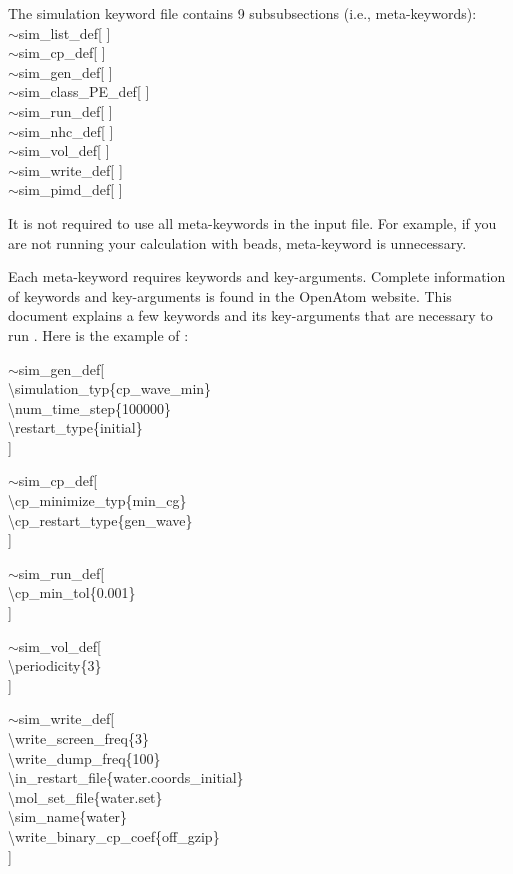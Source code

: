 The simulation keyword file contains 9 subsubsections (i.e., meta-keywords):\\
{\selectfont
$\sim$sim\_list\_def[ ]\\
$\sim$sim\_cp\_def[ ]\\
$\sim$sim\_gen\_def[ ]\\
$\sim$sim\_class\_PE\_def[ ]\\
$\sim$sim\_run\_def[ ]\\
$\sim$sim\_nhc\_def[ ]\\
$\sim$sim\_vol\_def[ ]\\
$\sim$sim\_write\_def[ ]\\
$\sim$sim\_pimd\_def[ ]\\
}

It is not required to use all meta-keywords in the input file. For example, if you are not running your calculation with beads, {\selectfont{sim\_pimd\_def[]}} meta-keyword is unnecessary. 

Each meta-keyword requires keywords and key-arguments. Complete information of keywords and key-arguments is found in the OpenAtom website. This document explains a few keywords and its key-arguments that are necessary to run {\selectfont{cp\_wave\_min}}.
Here is the example of {\selectfont{water.input}}:

{\selectfont
$\sim$sim\_gen\_def[\\
\textbackslash simulation\_typ\{cp\_wave\_min\} \\
\textbackslash num\_time\_step\{100000\} \\ 
\textbackslash restart\_type\{initial\}\\
 ]
 
$\sim$sim\_cp\_def[\\
\textbackslash cp\_minimize\_typ\{min\_cg\}\\
\textbackslash cp\_restart\_type\{gen\_wave\}\\
 ]

$\sim$sim\_run\_def[\\
\textbackslash cp\_min\_tol\{0.001\}\\
 ]

$\sim$sim\_vol\_def[\\
\textbackslash periodicity\{3\}\\
 ]

$\sim$sim\_write\_def[\\
\textbackslash write\_screen\_freq\{3\}\\
\textbackslash write\_dump\_freq\{100\}\\
\textbackslash in\_restart\_file\{water.coords\_initial\}\\
\textbackslash mol\_set\_file\{water.set\}\\
\textbackslash sim\_name\{water\}\\
\textbackslash write\_binary\_cp\_coef\{off\_gzip\}\\
 ]
}

